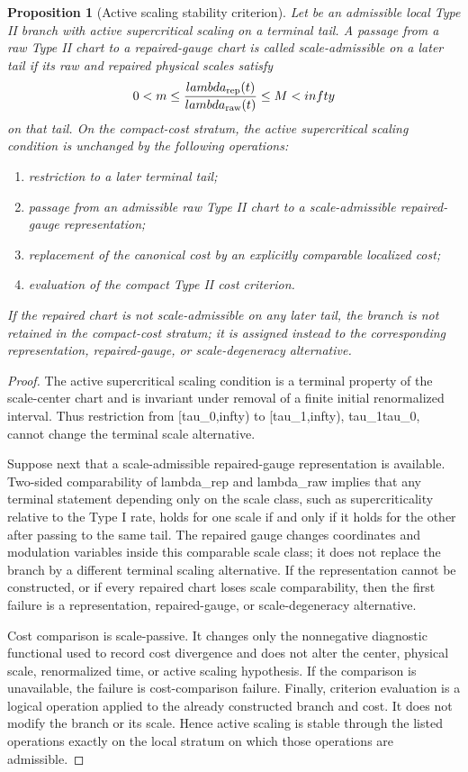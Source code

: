 \documentclass[11pt]{amsart}
\def\({}%
\def\){}%
\def\tau{tau}%
\def\lambda{lambda}%
\def\infty{infty}%
\theoremstyle{plain}
\newtheorem{proposition}[proposition]{Proposition}
\theoremstyle{definition}
\theoremstyle{remark}
\begin{document}
\begin{proposition}[Active scaling stability criterion]
\label{paper7:prop:active-scaling-stability-package}
Let \(\omega\) be an admissible local Type II branch with active supercritical
scaling on a terminal tail.  A passage from a raw Type II chart to a
repaired-gauge chart is called scale-admissible on a later tail if its raw and
repaired physical scales satisfy
\[
  0<m\le
  \frac{\lambda_{\rm rep}(t)}{\lambda_{\rm raw}(t)}
  \le M<\infty
\]
on that tail.  On the compact-cost stratum, the active supercritical scaling
condition is unchanged by the following operations:
\begin{enumerate}[label=\textup{(\roman*)}]
\item restriction to a later terminal tail;
\item passage from an admissible raw Type II chart to a scale-admissible
repaired-gauge representation;
\item replacement of the canonical cost by an explicitly comparable localized
cost;
\item evaluation of the compact Type II cost criterion.
\end{enumerate}
If the repaired chart is not scale-admissible on any later tail, the branch is
not retained in the compact-cost stratum; it is assigned instead to the
corresponding representation, repaired-gauge, or scale-degeneracy alternative.
\end{proposition}

\begin{proof}
The active supercritical scaling condition is a terminal property of the
scale-center chart and is invariant under removal of a finite initial
renormalized interval.  Thus restriction from \([\tau_0,\infty)\) to
\([\tau_1,\infty)\), \(\tau_1\ge\tau_0\), cannot change the terminal scale
alternative.
\par
Suppose next that a scale-admissible repaired-gauge representation is
available.  Two-sided comparability of \(\lambda_{\rm rep}\) and
\(\lambda_{\rm raw}\) implies that any terminal statement depending only on the
scale class, such as supercriticality relative to the Type I rate, holds for
one scale if and only if it holds for the other after passing to the same
tail.  The repaired gauge changes coordinates and modulation variables inside
this comparable scale class; it does not replace the branch by a different
terminal scaling alternative.  If the representation cannot be constructed, or
if every repaired chart loses scale comparability, then the first failure is a
representation, repaired-gauge, or scale-degeneracy alternative.
\par
Cost comparison is scale-passive.  It changes only the nonnegative diagnostic
functional used to record cost divergence and does not alter the center,
physical scale, renormalized time, or active scaling hypothesis.  If the
comparison is unavailable, the failure is cost-comparison failure.  Finally,
criterion evaluation is a logical operation applied to the already constructed
branch and cost.  It does not modify the branch or its scale.  Hence active
scaling is stable through the listed operations exactly on the local stratum on
which those operations are admissible.
\end{proof}
\end{document}

